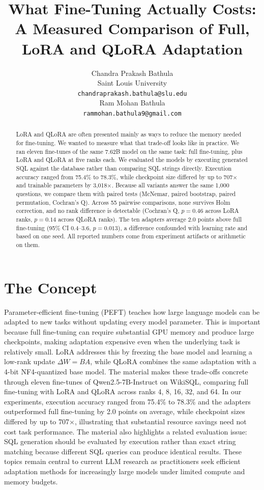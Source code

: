 \documentclass{article}
\title{What Fine-Tuning Actually Costs:\\A Measured Comparison of Full, LoRA and QLoRA Adaptation}
\author{%
  Chandra Prakash Bathula\\
  Saint Louis University\\
  \texttt{chandraprakash.bathula@slu.edu} \\ \And
  Ram Mohan Bathula \\
  \texttt{rammohan.bathula9@gmail.com}
}
\begin{document}
\maketitle


\begin{abstract}
LoRA and QLoRA are often presented mainly as ways to reduce the memory needed for fine-tuning. We wanted to measure what that trade-off looks like in practice. We ran eleven fine-tunes of the same 7.62B model on the same task: full fine-tuning, plus LoRA and QLoRA at five ranks each. We evaluated the models by executing generated SQL against the database rather than comparing SQL strings directly. Execution accuracy ranged from 75.4\% to 78.3\%, while checkpoint size differed by up to 707$\times$ and trainable parameters by 3{,}018$\times$. Because all variants answer the same 1{,}000 questions, we compare them with paired tests (McNemar, paired bootstrap, paired permutation, Cochran's Q). Across 55 pairwise comparisons, none survives Holm correction, and no rank difference is detectable (Cochran's Q, $p=0.46$ across LoRA ranks, $p=0.14$ across QLoRA ranks). The ten adapters average 2.0 points above full fine-tuning (95\% CI 0.4--3.6, $p=0.013$), a difference confounded with learning rate and based on one seed. All reported numbers come from experiment artifacts or arithmetic on them.
\end{abstract}
\section{The Concept}
Parameter-efficient fine-tuning (PEFT) teaches how large language models can be adapted to new tasks without updating every model parameter. This is important because full fine-tuning can require substantial GPU memory and produce large checkpoints, making adaptation expensive even when the underlying task is relatively small. LoRA addresses this by freezing the base model and learning a low-rank update $\Delta W = BA$, while QLoRA combines the same adaptation with a 4-bit NF4-quantized base model. The material makes these trade-offs concrete through eleven fine-tunes of Qwen2.5-7B-Instruct on WikiSQL, comparing full fine-tuning with LoRA and QLoRA across ranks 4, 8, 16, 32, and 64. In our experiments, execution accuracy ranged from 75.4\% to 78.3\% and the adapters outperformed full fine-tuning by 2.0 points on average, while checkpoint sizes differed by up to 707$\times$, illustrating that substantial resource savings need not cost task performance. The material also highlights a related evaluation issue: SQL generation should be evaluated by execution rather than exact string matching because different SQL queries can produce identical results. These topics remain central to current LLM research as practitioners seek efficient adaptation methods for increasingly large models under limited compute and memory budgets.
\end{document}
